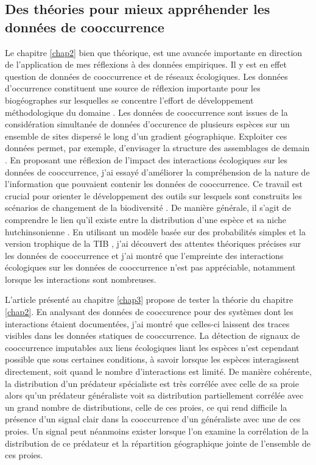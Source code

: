 \subsection*{Des théories pour mieux appréhender les données de
cooccurrence}\label{des-thuxe9ories-pour-mieux-appruxe9hender-les-donnuxe9es-de-cooccurrence}

Le chapitre \ref{chap2} bien que théorique, est une avancée importante
en direction de l'application de mes réflexions à des données
empiriques. Il y est en effet question de données de cooccurrence et de
réseaux écologiques. Les données d'occurrence constituent une source de
réflexion importante pour les biogéographes sur lesquelles se concentre
l'effort de développement méthodologique du domaine
\citep{Elith2006, Phillips2006, Pollock2014}. Les données de
cooccurrence sont issues de la considération simultanée de données
d'occurence de plusieurs espèces sur un ensemble de sites dispersé le
long d'un gradient géographique. Exploiter ces données permet, par
exemple, d'envisager la structure des assemblages de demain
\citep{Albouy2012}. En proposant une réflexion de l'impact des
interactions écologiques sur les données de cooccurrence, j'ai essayé
d'améliorer la compréhension de la nature de l'information que pouvaient
contenir les données de cooccurrence. Ce travail est crucial pour
orienter le développement des outils sur lesquels sont construits les
scénarios de changement de la biodiversité \citep{Godsoe2015}. De
manière générale, il s'agit de comprendre le lien qu'il existe entre la
distribution d'une espèce et sa niche hutchinsonienne
\citep{Pulliam2000, Godsoe2010a}. En utilisant un modèle basée sur des
probabilités simples et la version trophique de la TIB
\citep{Gravel2011}, j'ai découvert des attentes théoriques précises sur
les données de cooccurrence et j'ai montré que l'empreinte des
interactions écologiques sur les données de cooccurrence n'est pas
appréciable, notamment lorsque les interactions sont nombreuses.

L'article présenté au chapitre \ref{chap3} propose de tester la théorie
du chapitre \ref{chap2}. En analysant des données de cooccurence pour
des systèmes dont les interactions étaient documentées, j'ai montré que
celles-ci laissent des traces visibles dans les données statiques de
cooccurrence. La détection de signaux de cooccurrence imputables aux
liens écologiques liant les espèces n'est cependant possible que sous
certaines conditions, à savoir lorsque les espèces interagissent
directement, soit quand le nombre d'interactions est limité. De manière
cohérente, la distribution d'un prédateur spécialiste est très corrélée
avec celle de sa proie alors qu'un prédateur généraliste voit sa
distribution partiellement corrélée avec un grand nombre de
distributions, celle de ces proies, ce qui rend difficile la présence
d'un signal clair dans la cooccurrence d'un généraliste avec une de ces
proies. Un signal peut néanmoins exister lorsque l'on examine la
corrélation de la distribution de ce prédateur et la répartition
géographique jointe de l'ensemble de ces proies.


